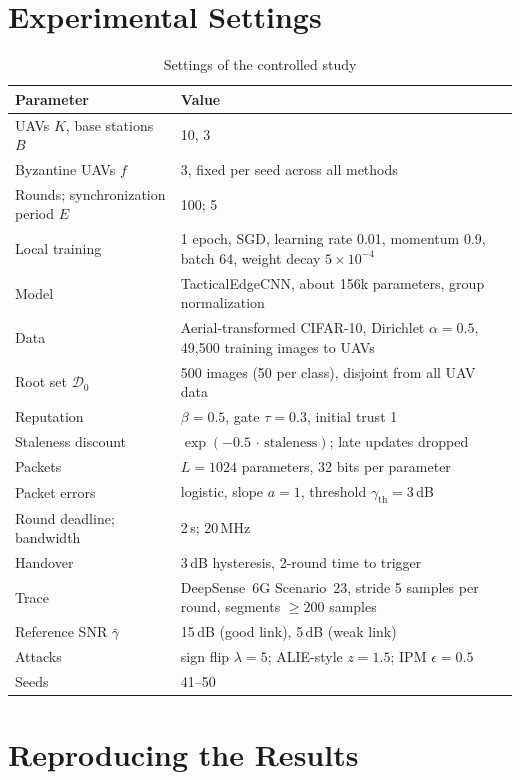 \chapter{Experimental Settings}
\label{app:settings}

\begin{table}[ht]
\centering
\caption{Settings of the controlled study}
\label{tab:settings}
\begin{tabularx}{\textwidth}{@{}l X@{}}
\toprule
Parameter & Value \\
\midrule
UAVs $K$, base stations $B$ & 10, 3 \\
Byzantine UAVs $f$ & 3, fixed per seed across all methods \\
Rounds; synchronization period $E$ & 100; 5 \\
Local training & 1 epoch, SGD, learning rate 0.01, momentum 0.9, batch 64, weight decay $5\times10^{-4}$ \\
Model & TacticalEdgeCNN, about 156k parameters, group normalization \\
Data & Aerial-transformed CIFAR-10, Dirichlet $\alpha=0.5$, 49{,}500 training images to UAVs \\
Root set $\mathcal{D}_0$ & 500 images (50 per class), disjoint from all UAV data \\
Reputation & $\beta=0.5$, gate $\tau=0.3$, initial trust 1 \\
Staleness discount & $\exp(-0.5\,\cdot\,\text{staleness})$; late updates dropped \\
Packets & $L=1024$ parameters, 32 bits per parameter \\
Packet errors & logistic, slope $a=1$, threshold $\gamma_{\mathrm{th}}=3$\,dB \\
Round deadline; bandwidth & 2\,s; 20\,MHz \\
Handover & 3\,dB hysteresis, 2-round time to trigger \\
Trace & DeepSense~6G Scenario~23, stride 5 samples per round, segments $\ge 200$ samples \\
Reference SNR $\bar\gamma$ & 15\,dB (good link), 5\,dB (weak link) \\
Attacks & sign flip $\lambda=5$; ALIE-style $z=1.5$; IPM $\epsilon=0.5$ \\
Seeds & 41--50 \\
\bottomrule
\end{tabularx}
\end{table}

\chapter{Reproducing the Results}
\label{app:repro}

